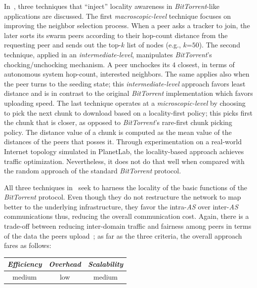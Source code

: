 In~\cite{LCLX2009}, three techniques that 
``inject'' locality awareness in {\sl BitTorrent}-like applications are discussed.
The first \emph{macroscopic-level} technique
focuses on improving the neighbor selection process. 
When a peer asks a tracker to join, 
the later sorts its swarm peers according to
their hop-count distance from the requesting peer and 
sends out the top-$k$ list of nodes (e.g., $k$=$50$).
The second technique, applied in an \emph{intermediate-level}, manipulates
{\sl BitTorrent}'s chocking/unchocking mechanism. A peer unchockes its $4$
closest, in terms of 
autonomous system hop-count, interested neighbors. 
The same applies also when the peer turns to 
the seeding state;  this  \emph{intermediate-level} approach favors
least distance and is in contrast to the original {\sl BitTorrent} 
implementation which favors uploading speed.
The last technique operates at a \emph{microscopic-level} by choosing to pick
the next chunk to download based on a locality-first policy; this picks first
the chunk that is closer, as opposed to {\sl BitTorrent}'s rare-first chunk
picking policy.
The distance value of a chunk is computed as the mean
value of the distances of the peers that posses it.
Through experimentation on a real-world Internet topology simulated in
{\sf PlanetLab}, the locality-based approach achieves traffic optimization.
Nevertheless, it does not do that well when compared with the
random approach of the standard {\sl BitTorrent} protocol.

All three techniques in~\cite{LCLX2009} seek to harness 
the locality of the basic functions of the
{\sl BitTorrent} protocol. 
Even though they do not restructure the network to map
better to the underlying infrastructure, they favor the intra-\emph{AS} 
over inter-\emph{AS} communications thus, reducing the overall communication cost.
Again, there is a trade-off between reducing inter-domain
traffic and fairness among peers in terms of the data the peers upload~\cite{LCLX2009};
as far as the three criteria, the overall approach fares as follows:
\begin{center}
{\footnotesize
\begin{tabular}{ccc}
\emph{Efficiency} & \emph{Overhead} & \emph{Scalability} \\
\hline
medium &
low &
medium
\end{tabular}
}
\end{center}

